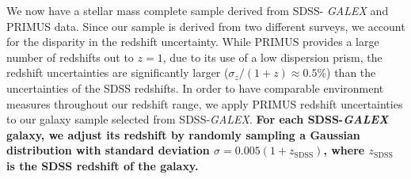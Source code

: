 \documentclass{emulateapj}
\begin{document}
We now have a stellar mass complete sample derived from SDSS-{\em
  GALEX} and PRIMUS data. Since our sample is derived from two
different surveys, we account for the disparity in the redshift
uncertainty. While PRIMUS provides a large number of redshifts out to
$z = 1$, due to its use of a low dispersion prism, the redshift
uncertainties are significantly larger ($\sigma_{z}/(1+z) \approx 0.5
\%$) than the uncertainties of the SDSS redshifts. In order to have
comparable environment measures throughout our redshift range, we
apply PRIMUS redshift uncertainties to our galaxy sample selected from
SDSS-{\em GALEX}. {\bf For each SDSS-{\em GALEX} galaxy, we adjust its
redshift by randomly sampling a Gaussian distribution with standard
deviation $\sigma = 0.005 (1+z_\mathrm{SDSS})$, where
$z_\mathrm{SDSS}$ is the SDSS redshift of the galaxy.}

\end{document}
